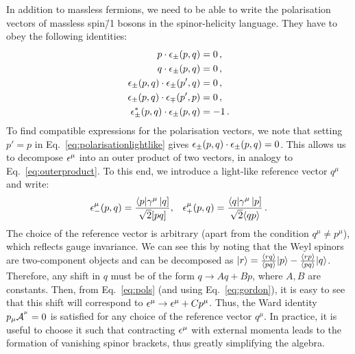 \documentclass[main.tex]{subfiles}
\begin{document}
In addition to massless fermions, we need to be able to write the polarisation vectors of massless spin\=/1 bosons in the spinor-helicity language. They have to obey the following identities:
\begin{subequations}
    \begin{align}
        p \cdot \epsilon_\pm(p, q) &= 0\,, \\
        q \cdot \epsilon_\pm(p, q) &= 0\,, \\
        \epsilon_\pm (p, q) \cdot \epsilon_\pm(p', q) &= 0\,, \label{eq:polarisationlightlike} \\
        \epsilon_\pm (p, q) \cdot \epsilon_\mp(p', p) &= 0\,, \\
        \epsilon_\pm^\ast (p, q) \cdot \epsilon_\pm(p, q) &= -1\,.
    \end{align}
\end{subequations}
To find compatible expressions for the polarisation vectors, we note that setting $p' = p$ in Eq.~\ref{eq:polarisationlightlike} gives $\epsilon_{\pm}(p, q) \cdot \epsilon_{\pm}(p, q) = 0$. This allows us to decompose $\epsilon^\mu$ into an outer product of two vectors, in analogy to Eq.~\ref{eq:outerproduct}. To this end, we introduce a light-like reference vector $q^\mu$ and write:
\begin{align} \label{eq:pols}
    \epsilon^\mu_{-}(p, q) = \frac{\langle p|\gamma^\mu\left| q \right]}{\sqrt{2}[ pq ]}, && \epsilon^\mu_{+}(p, q) = \frac{\langle q|\gamma^\mu\left| p \right]}{\sqrt{2}\langle qp \rangle} \,.
\end{align}
The choice of the reference vector is arbitrary (apart from the condition $q^\mu \neq p^\mu$), which reflects gauge invariance. We can see this by noting that the Weyl spinors are two-component objects and can be decomposed as $|r \rangle = \frac{\langle rq \rangle}{\langle pq \rangle}|p \rangle - \frac{\langle rp \rangle}{\langle pq \rangle}|q \rangle$. Therefore, any shift in $q$ must be of the form $q \rightarrow Aq + Bp$, where $A, B$ are constants. Then, from Eq.~\ref{eq:pols} (and using Eq.~\ref{eq:gordon}), it is easy to see that this shift will correspond to $\epsilon^\mu \rightarrow \epsilon^\mu + Cp^\mu$. Thus, the Ward identity $p_\mu \mathcal{A}_{}^{^\mu}=0$ is satisfied for any choice of the reference vector $q^\mu$. In practice, it is useful to choose it such that contracting $\epsilon^\mu$ with external momenta leads to the formation of vanishing spinor brackets, thus greatly simplifying the algebra.
\end{document}
